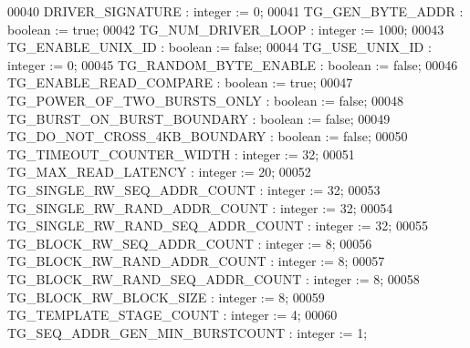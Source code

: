 \begin{DoxyCode}
00040             DRIVER\_SIGNATURE                       : \textcolor{comment}{integer} := \textcolor{vhdllogic}{}\textcolor{vhdllogic}{0};
00041             TG\_GEN\_BYTE\_ADDR                       : \textcolor{comment}{boolean} := true;
00042             TG\_NUM\_DRIVER\_LOOP                     : \textcolor{comment}{integer} := \textcolor{vhdllogic}{}\textcolor{vhdllogic}{1000};
00043             TG\_ENABLE\_UNIX\_ID                      : \textcolor{comment}{boolean} := false;
00044             TG\_USE\_UNIX\_ID                         : \textcolor{comment}{integer} := \textcolor{vhdllogic}{}\textcolor{vhdllogic}{0};
00045             TG\_RANDOM\_BYTE\_ENABLE                  : \textcolor{comment}{boolean} := false;
00046             TG\_ENABLE\_READ\_COMPARE                 : \textcolor{comment}{boolean} := true;
00047             TG\_POWER\_OF\_TWO\_BURSTS\_ONLY            : \textcolor{comment}{boolean} := false;
00048             TG\_BURST\_ON\_BURST\_BOUNDARY             : \textcolor{comment}{boolean} := false;
00049             TG\_DO\_NOT\_CROSS\_4KB\_BOUNDARY           : \textcolor{comment}{boolean} := false;
00050             TG\_TIMEOUT\_COUNTER\_WIDTH               : \textcolor{comment}{integer} := \textcolor{vhdllogic}{}\textcolor{vhdllogic}{32};
00051             TG\_MAX\_READ\_LATENCY                    : \textcolor{comment}{integer} := \textcolor{vhdllogic}{}\textcolor{vhdllogic}{20};
00052             TG\_SINGLE\_RW\_SEQ\_ADDR\_COUNT            : \textcolor{comment}{integer} := \textcolor{vhdllogic}{}\textcolor{vhdllogic}{32};
00053             TG\_SINGLE\_RW\_RAND\_ADDR\_COUNT           : \textcolor{comment}{integer} := \textcolor{vhdllogic}{}\textcolor{vhdllogic}{32};
00054             TG\_SINGLE\_RW\_RAND\_SEQ\_ADDR\_COUNT       : \textcolor{comment}{integer} := \textcolor{vhdllogic}{}\textcolor{vhdllogic}{32};
00055             TG\_BLOCK\_RW\_SEQ\_ADDR\_COUNT             : \textcolor{comment}{integer} := \textcolor{vhdllogic}{}\textcolor{vhdllogic}{8};
00056             TG\_BLOCK\_RW\_RAND\_ADDR\_COUNT            : \textcolor{comment}{integer} := \textcolor{vhdllogic}{}\textcolor{vhdllogic}{8};
00057             TG\_BLOCK\_RW\_RAND\_SEQ\_ADDR\_COUNT        : \textcolor{comment}{integer} := \textcolor{vhdllogic}{}\textcolor{vhdllogic}{8};
00058             TG\_BLOCK\_RW\_BLOCK\_SIZE                 : \textcolor{comment}{integer} := \textcolor{vhdllogic}{}\textcolor{vhdllogic}{8};
00059             TG\_TEMPLATE\_STAGE\_COUNT                : \textcolor{comment}{integer} := \textcolor{vhdllogic}{}\textcolor{vhdllogic}{4};
00060             TG\_SEQ\_ADDR\_GEN\_MIN\_BURSTCOUNT         : \textcolor{comment}{integer} := \textcolor{vhdllogic}{}\textcolor{vhdllogic}{1};

\end{DoxyCode}

